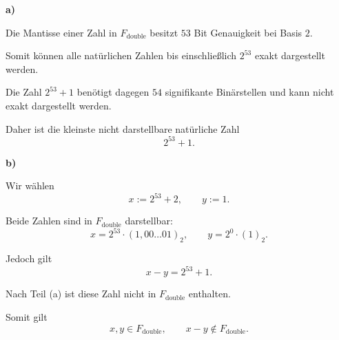 \documentclass{report}
\begin{document}
\sol

\begin{myproof}
  \textbf{a)}

  Die Mantisse einer Zahl in
  $F_{\mathrm{double}}$ besitzt $53$ Bit
  Genauigkeit bei Basis $2$.

  Somit können alle natürlichen Zahlen
  bis einschließlich $2^{53}$ exakt
  dargestellt werden.

  Die Zahl $2^{53}+1$ benötigt dagegen
  $54$ signifikante Binärstellen und
  kann nicht exakt dargestellt werden.

  Daher ist die kleinste nicht darstellbare
  natürliche Zahl
  \[
    \boxed{2^{53}+1.}
  \]

  \medskip
  \textbf{b)}

  Wir wählen
  \[
    x:=2^{53}+2,
    \qquad y:=1.
  \]

  Beide Zahlen sind in
  $F_{\mathrm{double}}$ darstellbar:
  \[
    x=2^{53}\cdot
      (1{,}00\ldots01)_2,
    \qquad
    y=2^0\cdot(1)_2.
  \]

  Jedoch gilt
  \[
    x-y=2^{53}+1.
  \]

  Nach Teil (a) ist diese Zahl nicht
  in $F_{\mathrm{double}}$ enthalten.

  Somit gilt
  \[
    \boxed{
      x,y\in F_{\mathrm{double}},
      \qquad x-y\notin F_{\mathrm{double}}.
    }
  \]
\end{myproof}


\newpage



\sol
\end{document}
